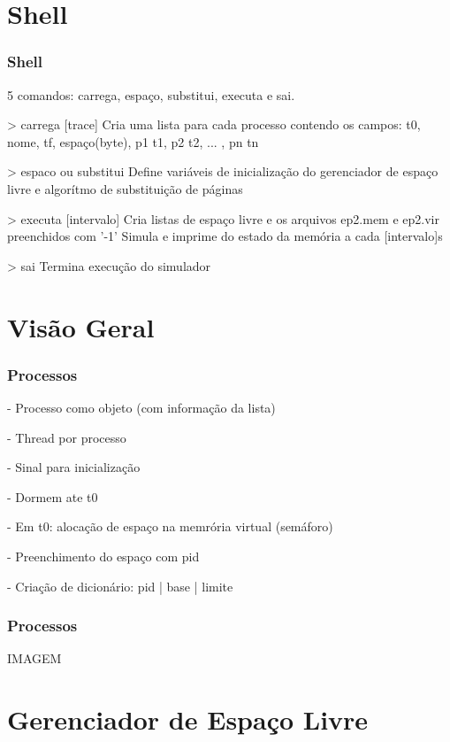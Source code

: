 \documentclass{beamer}
\begin{document}
\section{Shell}
\begin{frame}
\frametitle{Shell}

5 comandos: carrega, espaço, substitui, executa e sai.

> carrega [trace] 
  Cria uma lista para cada processo contendo os campos: 
  t0, nome, tf, espaço(byte), p1 t1, p2 t2, ... , pn tn

> espaco ou substitui
  Define variáveis de inicialização do gerenciador de espaço livre e algorítmo de substituição de páginas

> executa [intervalo]
  Cria listas de espaço livre e os arquivos ep2.mem e ep2.vir preenchidos com '-1'
  Simula e imprime do estado da memória a cada [intervalo]s
  
> sai
  Termina execução do simulador  

\end{frame}
\section{Visão Geral} 
\begin{frame}
\frametitle{Processos}

- Processo como objeto (com informação da lista)

- Thread por processo

- Sinal para inicialização

- Dormem ate t0

- Em t0: alocação de espaço na memrória virtual (semáforo)

- Preenchimento do espaço com pid

- Criação de dicionário: pid | base | limite
\justifying
\end{frame}


\begin{frame}
\frametitle{Processos}
IMAGEM
\justifying
\end{frame}


\section{Gerenciador de Espaço Livre} 
\end{document}
